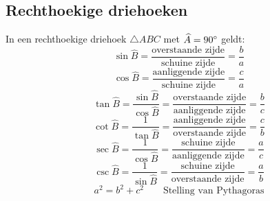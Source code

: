 \subsection{Rechthoekige driehoeken}
 \label{sec:rh_drhk}
   In een rechthoekige driehoek $\triangle ABC$ met $\widehat{A} = 90^\circ$ geldt:
   \[
	   \sin \widehat{B} = \frac{\textrm{overstaande zijde}}{\textrm{schuine zijde}} = \frac{b}{a}
   \]
   \[
	   \cos \widehat{B} = \frac{\textrm{aanliggende zijde}}{\textrm{schuine zijde}} = \frac{c}{a}
   \]  
   \[
	   \tan \widehat{B} = \frac{\sin \widehat{B}}{\cos \widehat{B}} = \frac{\textrm{overstaande zijde}}{\textrm{aanliggende zijde}} = \frac{b}{c}
   \]
   \[
	   \cot \widehat{B} = \frac{1}{\tan \widehat{B}} = \frac{\textrm{aanliggende zijde}}{\textrm{overstaande zijde}} = \frac{c}{b}
   \]
   \[
	   \sec \widehat{B} = \frac{1}{\cos \widehat{B}} = \frac{\textrm{schuine zijde}}{\textrm{aanliggende zijde}} = \frac{a}{c}
   \]
   \[
	   \csc \widehat{B} = \frac{1}{\sin \widehat{B}} = \frac{\textrm{schuine zijde}}{\textrm{overstaande zijde}} = \frac{a}{b}
   \]
   \[
	   a^{2} = b^{2} + c^{2} \qquad \textrm{Stelling van Pythagoras}
   \]